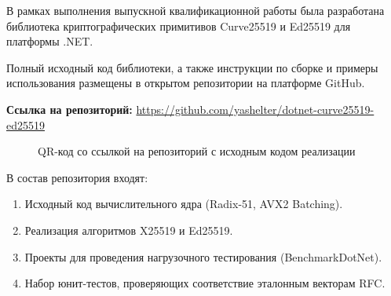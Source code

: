 В рамках выполнения выпускной квалификационной работы была разработана библиотека криптографических примитивов Curve25519 и Ed25519 для платформы .NET.

Полный исходный код библиотеки, а также инструкции по сборке и примеры использования размещены в открытом репозитории на платформе GitHub.


\textbf{Ссылка на репозиторий:} \url{https://github.com/yashelter/dotnet-curve25519-ed25519}


\begin{figure}[H]
    \centering
    
    \vspace{1ex}
    \caption{QR-код со ссылкой на репозиторий с исходным кодом реализации}
    \label{fig:qr_code_github}
\end{figure}

В состав репозитория входят:


\begin{enumerate}
    \item Исходный код вычислительного ядра (Radix-51, AVX2 Batching).
    \item Реализация алгоритмов X25519 и Ed25519.
    \item Проекты для проведения нагрузочного тестирования (BenchmarkDotNet).
    \item Набор юнит-тестов, проверяющих соответствие эталонным векторам RFC.
\end{enumerate}